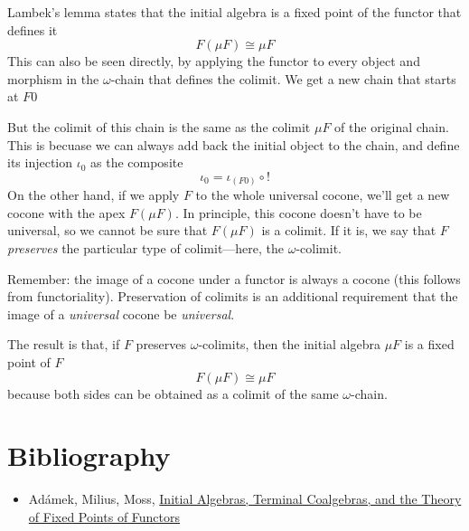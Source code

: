 \documentclass[11pt]{amsart}
\begin{document}
Lambek's lemma states that the initial algebra is a fixed point of the functor that defines it
\[F (\mu F) \cong \mu F\]
This can also be seen directly, by applying the functor to every object and morphism in the $\omega$-chain that defines the colimit. We get a new chain that starts at $F 0$
\begin{figure}[H]
\centering
{}
\end{figure}
But the colimit of this chain is the same as the colimit $\mu F$ of the original chain. This is becuase we can always add back the initial object to the chain, and define its injection $\iota_0$ as the composite  
\[\iota_0 = \iota_{(F 0)}  \circ !\]
On the other hand, if we apply $F$ to the whole universal cocone, we'll get a new cocone with the apex $F (\mu F)$. In principle, this cocone doesn't have to be universal, so we cannot be sure that $F (\mu F)$ is a colimit. If it is, we say that $F$ \textit{preserves} the particular type of colimit---here, the $\omega$-colimit. 

Remember: the image of a cocone under a functor is always a cocone (this follows from functoriality). Preservation of colimits is an additional requirement that the image of a \textit{universal} cocone be \textit{universal}. 

The result is that, if $F$ preserves $\omega$-colimits, then the initial algebra $\mu F$ is a fixed point of $F$
\[F(\mu F) \cong \mu F\]
because both sides can be obtained as a colimit of the same $\omega$-chain. 

\section{Bibliography}
\begin{itemize}  
  
\item Ad\'amek, Milius, Moss, \href{https://www8.cs.fau.de/staff/milius/publications/files/CoalgebraBook.pdf}{Initial Algebras, Terminal Coalgebras, and
the Theory of Fixed Points of Functors}
\end{itemize}
\end{document}
